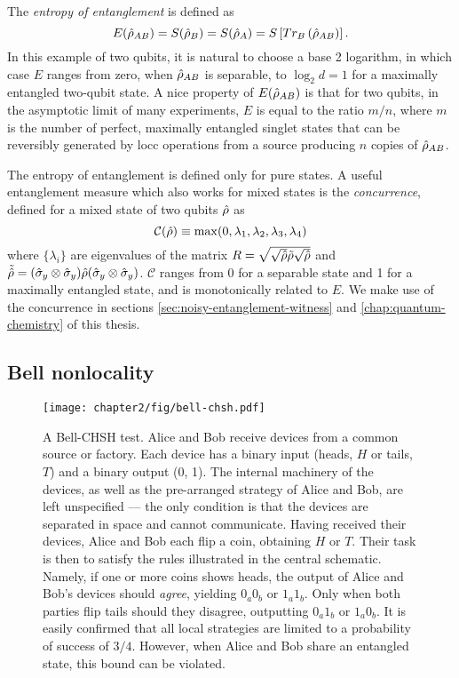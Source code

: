 The \emph{entropy of entanglement} is defined \cite{Bennett1996} as 
\begin{equation}
E(\hat{\rho}_{AB}) = S(\hat{\rho}_B) = S(\hat{\rho}_A) = S\left[Tr_B \left( \hat{\rho}_{AB} \right) \right].
\label{eqn:entropy-of-entanglement}
\end{equation}
In this example of two qubits, it is natural to choose a base 2 logarithm, in which case $E$ ranges from zero, when $\hat{\rho}_{AB}$ is separable, to $\log_2 d = 1$ for a maximally entangled two-qubit state.  A nice property of $E(\hat{\rho}_{AB})$ is that for two qubits, in the asymptotic limit of many experiments, $E$ is equal to the ratio $m/n$, where $m$ is the number of perfect, maximally entangled singlet states that can be reversibly generated by \gls{locc} operations from a source producing $n$ copies of $\hat{\rho}_{AB}$.

The entropy of entanglement is defined only for pure states. A useful entanglement measure which also works for mixed states is the \emph{concurrence}, defined for a mixed state of two qubits $\hat{\rho}$ as
\begin{equation}
\mathcal{C}(\hat{\rho}) \equiv \max(0, \lambda_1, \lambda_2, \lambda_3, \lambda_4)
\label{eqn:concurrence}
\end{equation}
where $\{\lambda_i\}$ are eigenvalues of the matrix $R=\sqrt{\sqrt{\hat{\rho}} \tilde{\rho} \sqrt{\hat{\rho}}}$ and $\tilde{\hat{\rho}} = (\hat{\sigma}_y \otimes \hat{\sigma}_y) \hat{\rho} (\hat{\sigma}_y \otimes \hat{\sigma}_y)$. $\mathcal{C}$ ranges from 0 for a separable state and 1 for a maximally entangled state, and is monotonically related to $E$. We make use of the concurrence in sections \ref{sec:noisy-entanglement-witness} and \ref{chap:quantum-chemistry} of this thesis.

\subsection{Bell nonlocality}
\label{sec:nonlocality}

\begin{figure}[t!]
\centering
\texttt{[image: chapter2/fig/bell-chsh.pdf]}
\caption[A Bell-CHSH test]{ 
    A Bell-CHSH test. Alice and Bob receive devices from a common source or factory. Each device has a binary input (heads, $H$ or tails, $T$) and a binary output (0, 1). The internal machinery of the devices, as well as the pre-arranged strategy of Alice and Bob, are left unspecified --- the only condition is that the devices are separated in space and cannot communicate. Having received their devices, Alice and Bob each flip a coin, obtaining $H$ or $T$.  Their task is then to satisfy the rules illustrated in the central schematic. Namely, if one or more coins shows heads, the output of Alice and Bob's devices should \emph{agree}, yielding $0_a0_b$ or $1_a1_b$. Only when both parties flip tails should they disagree, outputting $0_a1_b$ or $1_a0_b$. It is easily confirmed that all local strategies are limited to a probability of success of $3/4$. However, when Alice and Bob share an entangled state, this bound can be violated.
}
\label{fig:bell-chsh-test}
\end{figure}


